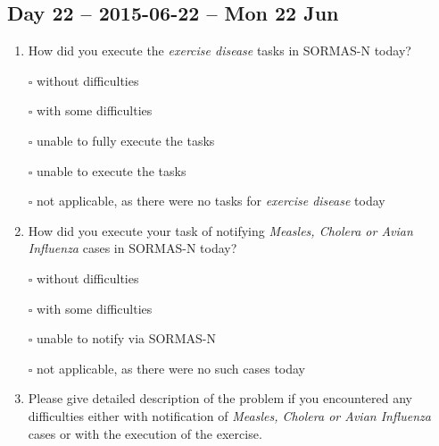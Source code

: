 \documentclass[a4paper, titlepage]{tufte-handout}
\begin{document}
\subsection{Day 22 -- 2015-06-22 -- Mon 22 Jun}
\label{sec-8-16}
\begin{enumerate}
\item How did you execute the \emph{exercise disease} tasks in SORMAS-N today?

\quad $\square$ without difficulties

\quad $\square$ with some difficulties

\quad $\square$ unable to fully execute the tasks

\quad $\square$ unable to execute the tasks

\quad $\square$ not applicable, as there were no tasks for \emph{exercise disease} today

\item How did you execute your task of notifying \emph{Measles, Cholera or Avian Influenza} cases in SORMAS-N today?

\quad $\square$ without difficulties

\quad $\square$ with some difficulties

\quad $\square$ unable to notify via SORMAS-N

\quad $\square$ not applicable, as there were no such cases today

\item Please give detailed description of the problem if you encountered any difficulties either with notification of \emph{Measles, Cholera or Avian Influenza} cases or with the execution of the exercise.

\hrulefill

\hrulefill

\hrulefill

\hrulefill

\hrulefill

\hrulefill

\hrulefill

\hrulefill

\hrulefill

\hrulefill
\end{enumerate}

\newpage
\end{document}
